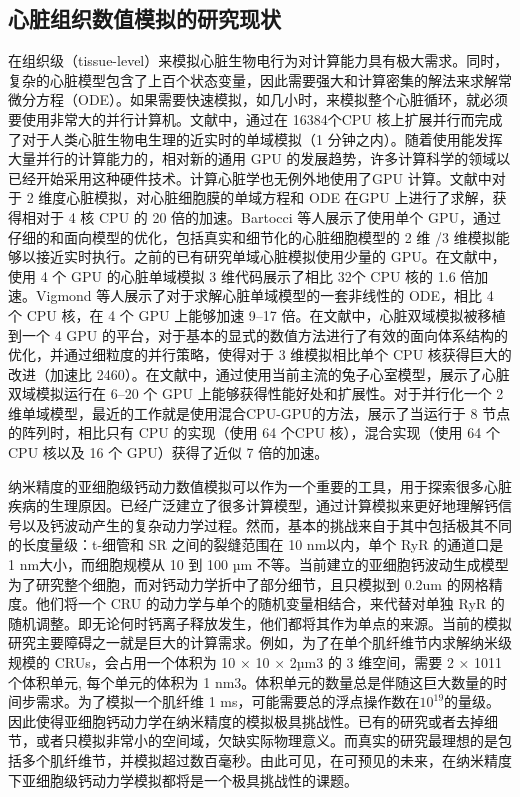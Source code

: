\subsection{心脏组织数值模拟的研究现状}
在组织级（tissue-level）来模拟心脏生物电行为对计算能力具有极大需求。同时，复杂的心脏模型包含了上百个状态变量，因此需要强大和计算密集的解法来求解常微分方程（ODE）。如果需要快速模拟，如几小时，来模拟整个心脏循环，就必须要使用非常大的并行计算机。文献中，通过在 16384个CPU 核上扩展并行而完成了对于人类心脏生物电生理的近实时的单域模拟（1 分钟之内）。随着使用能发挥大量并行的计算能力的，相对新的通用 GPU 的发展趋势，许多计算科学的领域以已经开始采用这种硬件技术。计算心脏学也无例外地使用了GPU 计算。文献中对于 2 维度心脏模拟，对心脏细胞膜的单域方程和 ODE 在GPU 上进行了求解，获得相对于 4 核 CPU 的 20 倍的加速。Bartocci 等人展示了使用单个 GPU，通过仔细的和面向模型的优化，包括真实和细节化的心脏细胞模型的 2 维 /3 维模拟能够以接近实时执行。之前的已有研究单域心脏模拟使用少量的 GPU。在文献中，使用 4 个 GPU 的心脏单域模拟 3 维代码展示了相比 32个 CPU 核的 1.6 倍加速。Vigmond 等人展示了对于求解心脏单域模型的一套非线性的 ODE，相比 4 个 CPU 核，在 4 个 GPU 上能够加速 9–17 倍。在文献中，心脏双域模拟被移植到一个 4 GPU 的平台，对于基本的显式的数值方法进行了有效的面向体系结构的优化，并通过细粒度的并行策略，使得对于 3 维模拟相比单个 CPU 核获得巨大的改进（加速比 2460）。在文献中，通过使用当前主流的兔子心室模型，展示了心脏双域模拟运行在 6–20 个 GPU 上能够获得性能好处和扩展性。对于并行化一个 2 维单域模型，最近的工作就是使用混合CPU-GPU的方法，展示了当运行于 8 节点的阵列时，相比只有 CPU 的实现（使用 64 个CPU 核），混合实现（使用 64 个 CPU 核以及 16 个 GPU）获得了近似 7 倍的加速。

 纳米精度的亚细胞级钙动力数值模拟可以作为一个重要的工具，用于探索很多心脏疾病的生理原因。已经广泛建立了很多计算模型，通过计算模拟来更好地理解钙信号以及钙波动产生的复杂动力学过程。然而，基本的挑战来自于其中包括极其不同的长度量级：t-细管和 SR 之间的裂缝范围在 10 nm以内，单个 RyR 的通道口是 1 nm大小，而细胞规模从 10 到 100 µm 不等。当前建立的亚细胞钙波动生成模型为了研究整个细胞，而对钙动力学折中了部分细节，且只模拟到 0.2um 的网格精度。他们将一个 CRU 的动力学与单个的随机变量相结合，来代替对单独 RyR 的随机调整。即无论何时钙离子释放发生，他们都将其作为单点的来源。当前的模拟研究主要障碍之一就是巨大的计算需求。例如，为了在单个肌纤维节内求解纳米级规模的 CRUs，会占用一个体积为 10 × 10 × 2µm3 的 3 维空间，需要 2 × 1011 个体积单元, 每个单元的体积为 1 nm3。体积单元的数量总是伴随这巨大数量的时间步需求。为了模拟一个肌纤维 1 ms，可能需要总的浮点操作数在$10^19$的量级。因此使得亚细胞钙动力学在纳米精度的模拟极具挑战性。已有的研究或者去掉细节，或者只模拟非常小的空间域，欠缺实际物理意义。而真实的研究最理想的是包括多个肌纤维节，并模拟超过数百毫秒。由此可见，在可预见的未来，在纳米精度下亚细胞级钙动力学模拟都将是一个极具挑战性的课题。

